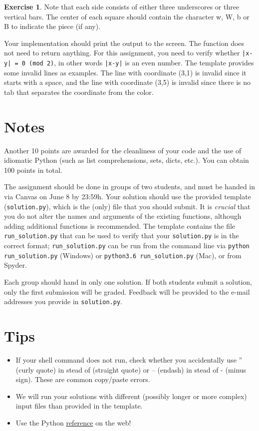 \documentclass[a4paper]{report}
\theoremstyle{definition}
\newtheorem{exercise}{Exercise}
\begin{document}
\begin{exercise}
	\noindent Note that each side consists of either three underscores or three vertical bars. The center of each square should contain the character w, W, b or B to indicate the piece (if any).
		
	Your implementation should print the output to the screen. The function does not need to return anything. For this assignment, you need to verify whether \texttt{|x-y| = 0 (mod 2)}, in other words \texttt{|x-y|} is an even number. The template provides some invalid
	lines as examples. The line with coordinate (3,1) is invalid since it starts with a space, and the line with coordinate (3,5) is invalid	since there is no tab that separates the coordinate from the color.
\end{exercise}

\section*{Notes}
Another 10 points are awarded for the cleanliness of your code and the use of idiomatic Python (such as list comprehensions, sets, dicts,
etc.). You can obtain 100 points in total.

The assignment should be done in groups of two students, and must be handed in
via Canvas on June 8 by 23:59h.
Your solution should use the provided template (\texttt{solution.py}), which is the (only) file that you should submit. It is \emph{crucial} that you do not alter the names and arguments of the existing functions, although adding additional functions is recommended. The template contains the file \texttt{run\_solution.py} that can be used to verify that your \texttt{solution.py} is in the correct format; \texttt{run\_solution.py} can be run from the command line via \texttt{python run\_solution.py} (Windows) or \texttt{python3.6 run\_solution.py} (Mac), or from Spyder.

Each group should hand in only one solution. If both students submit a solution, only the first submission will be graded. Feedback will be provided to the e-mail addresses you provide in \texttt{solution.py}.

\section*{Tips}

\begin{itemize}
	\setlength\itemsep{1mm}
	\item If your shell command does not run, check whether you
	accidentally use ” (curly quote) in stead of \textquotedbl{} (straight quote) or –
	(endash) in stead of - (minus sign). These are common copy/paste errors.
	\item We will run your solutions with different (possibly longer or more complex) input files than provided in the template.
	\item Use the Python \href{https://docs.python.org/3/}{reference} on the web!
\end{itemize}
\end{document}
